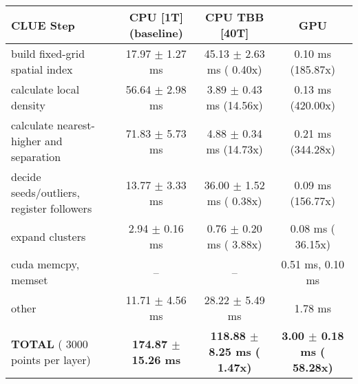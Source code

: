    \begin{tabular}{l|c|c|c}
    \hline
    CLUE Step                                 & CPU [1T] (baseline)         & CPU TBB [40T]                         & GPU                       \\ \hline
    build fixed-grid spatial index            &  17.97 $\pm$  1.27 ms       &  45.13 $\pm$  2.63 ms ( 0.40x)        &   0.10 ms (185.87x)       \\
    calculate local density                   &  56.64 $\pm$  2.98 ms       &   3.89 $\pm$  0.43 ms (14.56x)        &   0.13 ms (420.00x)       \\
    calculate nearest-higher and separation   &  71.83 $\pm$  5.73 ms       &   4.88 $\pm$  0.34 ms (14.73x)        &   0.21 ms (344.28x)       \\
    decide seeds/outliers, register followers &  13.77 $\pm$  3.33 ms       &  36.00 $\pm$  1.52 ms ( 0.38x)        &   0.09 ms (156.77x)       \\
    expand clusters                           &   2.94 $\pm$  0.16 ms       &   0.76 $\pm$  0.20 ms ( 3.88x)        &   0.08 ms ( 36.15x)       \\ \hline
    cuda memcpy, memset                       & --                          & --                                    &   0.51 ms,   0.10 ms      \\ 
    other                                     &  11.71 $\pm$  4.56 ms       &  28.22 $\pm$  5.49 ms                 &   1.78 ms                 \\ \hline
    \textbf{TOTAL} ( 3000 points per layer)   & \textbf{174.87 $\pm$ 15.26 ms} & \textbf{118.88 $\pm$  8.25 ms ( 1.47x)} & \textbf{  3.00 $\pm$  0.18 ms ( 58.28x)}  \\
    \hline 
    \end{tabular}
    \linebreak


